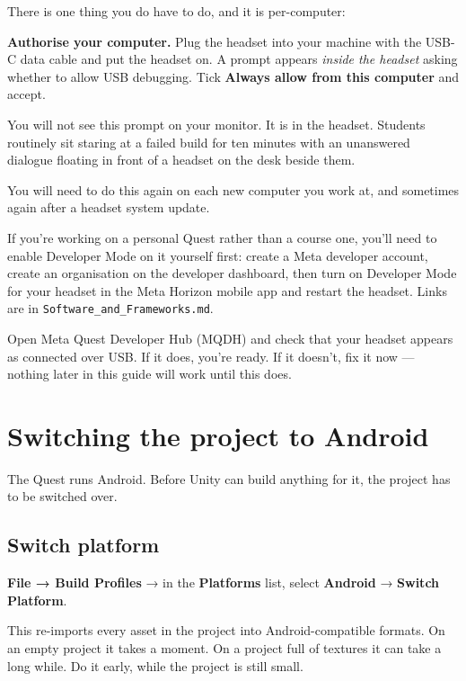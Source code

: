 \documentclass[11pt,a4paper]{article}
\begin{document}
There is one thing you do have to do, and it is per-computer:

\textbf{Authorise your computer.} Plug the headset into your machine with the USB-C data cable
and put the headset on. A prompt appears \emph{inside the headset} asking whether to allow USB
debugging. Tick \textbf{Always allow from this computer} and accept.

You will not see this prompt on your monitor. It is in the headset. Students routinely sit
staring at a failed build for ten minutes with an unanswered dialogue floating in front of
a headset on the desk beside them.

You will need to do this again on each new computer you work at, and sometimes again after
a headset system update.

\begin{plainbox}
If you're working on a personal Quest rather than a course
one, you'll need to enable Developer Mode on it yourself first: create a Meta developer
account, create an organisation on the developer dashboard, then turn on Developer Mode
for your headset in the Meta Horizon mobile app and restart the headset. Links are in
\texttt{Software\_and\_Frameworks.md}.
\end{plainbox}

\begin{keybox}[Checkpoint]
Open Meta Quest Developer Hub (MQDH) and check that your headset appears
as connected over USB. If it does, you're ready. If it doesn't, fix it now --- nothing
later in this guide will work until this does.
\end{keybox}


\section{Switching the project to Android}\label{switching-the-project-to-android}

The Quest runs Android. Before Unity can build anything for it, the project has to be
switched over.

\subsection{Switch platform}\label{switch-platform}

\textbf{File → Build Profiles} → in the \textbf{Platforms} list, select \textbf{Android} →
\textbf{Switch Platform}.

This re-imports every asset in the project into Android-compatible formats. On an empty
project it takes a moment. On a project full of textures it can take a long while. Do it
early, while the project is still small.
\end{document}

